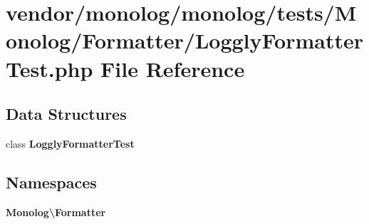 \section{vendor/monolog/monolog/tests/\+Monolog/\+Formatter/\+Loggly\+Formatter\+Test.php File Reference}
\label{_loggly_formatter_test_8php}
\subsection*{Data Structures}
\begin{DoxyCompactItemize}
\item 
class {\bf Loggly\+Formatter\+Test}
\end{DoxyCompactItemize}
\subsection*{Namespaces}
\begin{DoxyCompactItemize}
\item 
 {\bf Monolog\textbackslash{}\+Formatter}
\end{DoxyCompactItemize}
